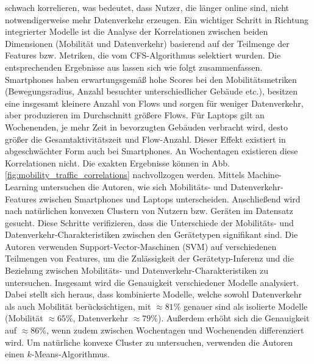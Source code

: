 \documentclass[12pt, a4paper]{article}
\begin{document}
schwach korrelieren, was bedeutet, dass Nutzer, die länger online sind, nicht notwendigerweise mehr Datenverkehr erzeugen. \cite{Alipour2018}
\newline
Ein wichtiger Schritt in Richtung integrierter Modelle ist die Analyse der Korrelationen
zwischen beiden Dimensionen (Mobilität und Datenverkehr) basierend auf der Teilmenge der Features bzw. Metriken,
die vom \textsc{CFS}-Algorithmus selektiert wurden. Die entsprechenden Ergebnisse aus \cite{Alipour2018} lassen sich wie 
folgt zusammenfassen. Smartphones haben erwartungsgemäß hohe Scores bei den Mobilitätsmetriken (Bewegungsradius,
Anzahl besuchter unterschiedlicher Gebäude etc.), besitzen eine
insgesamt kleinere Anzahl von Flows und sorgen für weniger Datenverkehr, aber produzieren im Durchschnitt größere Flows.
Für Laptops gilt an Wochenenden, je mehr Zeit in bevorzugten Gebäuden verbracht wird, desto größer die Gesamtaktivitätszeit
und Flow-Anzahl. Dieser Effekt existiert in abgeschwächter Form auch bei Smartphones. 
An Wochentagen existieren diese Korrelationen nicht. Die exakten Ergebnisse können in Abb. \ref{fig:mobility_traffic_correlations}
nachvollzogen werden. Mittels Machine-Learning untersuchen die Autoren, wie sich Mobilitäts- und Datenverkehr-Features zwischen
Smartphones und Laptops unterscheiden. Anschließend wird nach natürlichen konvexen Clustern von Nutzern bzw. Geräten im
Datensatz gesucht. Diese Schritte verifizieren, dass die Unterschiede der Mobilitäts- und Datenverkehr-Charakteristiken
zwischen den Gerätetypen signifikant sind.\newline
Die Autoren verwenden Support-Vector-Maschinen (SVM) auf verschiedenen Teilmengen von Features, 
um die Zulässigkeit der Gerätetyp-Inferenz und die Beziehung zwischen Mobilitäts- und Datenverkehr-Charakteristiken
zu untersuchen. Insgesamt wird die Genauigkeit verschiedener Modelle analysiert. Dabei stellt sich heraus,
dass kombinierte Modelle, welche sowohl Datenverkehr als auch Mobilität berücksichtigen, 
mit $\approx 81 \%$ genauer sind als isolierte Modelle (Mobilität $\approx 65 \%$, Datenverkehr $\approx 79 \%$).
Außerdem erhöht sich die Genauigkeit auf $\approx 86 \%$, wenn zudem zwischen Wochentagen und Wochenenden differenziert wird.\newline
Um natürliche konvexe Cluster zu untersuchen, verwenden die Autoren einen $k$-Means-Algorithmus.
\end{document}
